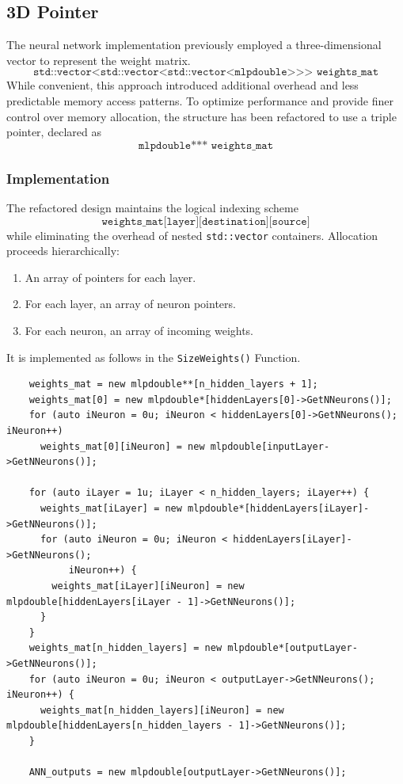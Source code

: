 \documentclass{article}
\begin{document}
\subsection{3D Pointer}
The neural network implementation previously employed a three-dimensional vector to represent the weight matrix.
\[
\texttt{std::vector<std::vector<std::vector<mlpdouble>>> weights\_mat}
\]
While convenient, this approach introduced additional overhead and less predictable memory access patterns. To optimize performance and provide finer control over memory allocation, the structure has been refactored to use a triple pointer, declared as
\[
\texttt{mlpdouble*** weights\_mat}
\]

\subsubsection{Implementation}
The refactored design maintains the logical indexing scheme 
\[
\texttt{weights\_mat[layer][destination][source]}
\]
while eliminating the overhead of nested \texttt{std::vector} containers. Allocation proceeds hierarchically:
\begin{enumerate}
  \item An array of pointers for each layer.
  \item For each layer, an array of neuron pointers.
  \item For each neuron, an array of incoming weights.
\end{enumerate}
It is implemented as follows in the \texttt{SizeWeights()} Function.
\begin{verbatim}
    weights_mat = new mlpdouble**[n_hidden_layers + 1];
    weights_mat[0] = new mlpdouble*[hiddenLayers[0]->GetNNeurons()];
    for (auto iNeuron = 0u; iNeuron < hiddenLayers[0]->GetNNeurons(); iNeuron++)
      weights_mat[0][iNeuron] = new mlpdouble[inputLayer->GetNNeurons()];

    for (auto iLayer = 1u; iLayer < n_hidden_layers; iLayer++) {
      weights_mat[iLayer] = new mlpdouble*[hiddenLayers[iLayer]->GetNNeurons()];
      for (auto iNeuron = 0u; iNeuron < hiddenLayers[iLayer]->GetNNeurons();
           iNeuron++) {
        weights_mat[iLayer][iNeuron] = new mlpdouble[hiddenLayers[iLayer - 1]->GetNNeurons()];
      }
    }
    weights_mat[n_hidden_layers] = new mlpdouble*[outputLayer->GetNNeurons()];
    for (auto iNeuron = 0u; iNeuron < outputLayer->GetNNeurons(); iNeuron++) {
      weights_mat[n_hidden_layers][iNeuron] = new mlpdouble[hiddenLayers[n_hidden_layers - 1]->GetNNeurons()];
    }

    ANN_outputs = new mlpdouble[outputLayer->GetNNeurons()];
\end{verbatim}
\end{document}
